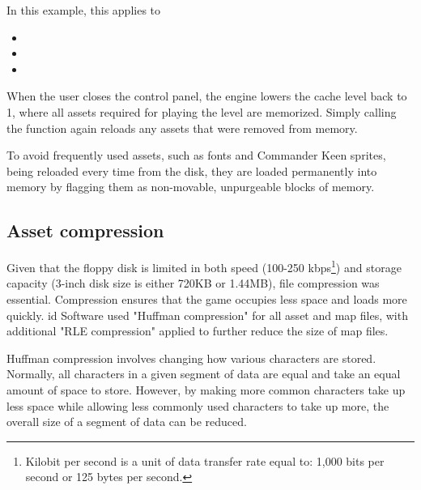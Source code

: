 \documentclass[book.tex]{subfiles}
\begin{document}


\par
In this example, this applies to 
\begin{itemize}
  \item {}
  \item {}
  \item {} 
\end{itemize}

\par
When the user closes the control panel, the engine lowers the cache level back to 1, where all assets required for playing the level are memorized. Simply calling the function  again reloads any assets that were removed from memory.\\

\pagebreak

\par
To avoid frequently used assets, such as fonts and Commander Keen sprites, being reloaded every time from the disk, they are loaded permanently into memory by flagging them as non-movable, unpurgeable blocks of memory. \\

\par

\par
 
\subsection{Asset compression}
Given that the floppy disk is limited in both speed (100-250 kbps\footnote{Kilobit per second is a unit of data transfer rate equal to: 1,000 bits per second or 125 bytes per second.}) and storage capacity (3-inch disk size is either 720KB or 1.44MB), file compression was essential. Compression ensures that the game occupies less space and loads more quickly. id Software used "Huffman compression" for all asset and map files, with additional "RLE compression" applied to further reduce the size of map files.\\


\par
Huffman compression involves changing how various characters are stored. Normally, all characters in a given segment of data are equal and take an equal amount of space to store. However, by making more common characters take up less space while allowing less commonly used characters to take up more, the overall size of a segment of data can be reduced. \\
\end{document}
